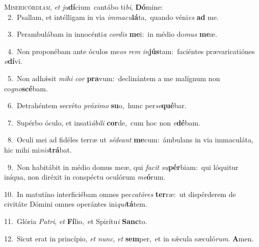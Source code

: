 \lettrine{\initial\textcolor{\initialcolor}{M}}{isericórdi\-\textit{am}\-,} \textit{et} \textit{ju}\-\textbf{dí}cium~\star cantábo ti\-\textit{bi}\-, \textbf{Dó}\-mine:\\
{\numbfont\textcolor{\numbcolor}{~2.}}~Psallam, et intélligam in via \textit{im}\-\textit{ma}\textit{cu}\textbf{lá}ta,~\star quando véni\textit{es} \textbf{ad} me.\par
{\numbfont\textcolor{\numbcolor}{~3.}}~Perambulábam in innocénti\textit{a} \textit{cor}\-\textit{dis} \textbf{me}\-i:~\star in médio do\textit{mus} \textbf{me}\-æ.\par
{\numbfont\textcolor{\numbcolor}{~4.}}~Non proponébam ante óculos me\textit{os} \textit{rem} \textit{in}\-\textbf{jús}tam:~\star faciéntes prævaricatiónes \textit{o}\-\textbf{dí}vi.\par
{\numbfont\textcolor{\numbcolor}{~5.}}~Non adhǽsit \textit{mi}\-\textit{hi} \textit{cor} \textbf{pra}\-vum:~\star declinántem a me malígnum non co\-\textit{gno}\-\textbf{scé}bam.\par
{\numbfont\textcolor{\numbcolor}{~6.}}~Detrahéntem secréto \textit{pró}\-\textit{xi}\textit{mo} \textbf{su}\-o,~\star hunc per\-\textit{se}\-\textbf{qué}bar.\par
{\numbfont\textcolor{\numbcolor}{~7.}}~Supérbo óculo, et insati\-\textit{á}\-\textit{bi}\textit{li} \textbf{cor}\-de,~\star cum hoc non \textit{e}\-\textbf{dé}bam.\par
{\numbfont\textcolor{\numbcolor}{~8.}}~Oculi mei ad fidéles terræ ut \textit{sé}\-\textit{de}\textit{ant} \textbf{me}\-cum:~\star ámbulans in via immaculáta, hic mihi mi\-\textit{nis}\-\textbf{trá}bat.\par
{\numbfont\textcolor{\numbcolor}{~9.}}~Non habitábit in médio domus meæ, qui \textit{fa}\-\textit{cit} \textit{su}\-\textbf{pér}biam:~\star qui lóquitur iníqua, non diréxit in conspéctu oculórum \textit{me}\-\textbf{ó}rum.\par
{\numbfont\textcolor{\numbcolor}{10.}}~In matutíno interficiébam omnes pec\-\textit{ca}\-\textit{tó}\textit{res} \textbf{ter}\-ræ:~\star ut dispérderem de civitáte Dómini omnes operántes ini\-\textit{qui}\-\textbf{tá}tem.\par
{\numbfont\textcolor{\numbcolor}{11.}}~Glória \textit{Pa}\-\textit{tri}, \textit{et} \textbf{Fí}\-lio,~\star et Spirítu\textit{i} \textbf{Sanc}\-to.\par
{\numbfont\textcolor{\numbcolor}{12.}}~Sicut erat in princípio, \textit{et} \textit{nunc}\-, \textit{et} \textbf{sem}\-per,~\star et in sǽcula sæculó\-\textit{rum}\-. \textbf{A}\-men.\par

